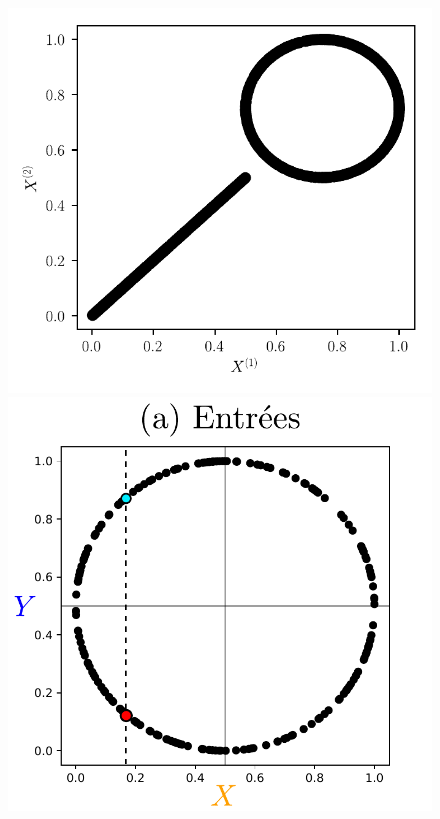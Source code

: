 \documentclass[../main]{subfiles}
\begin{document}
\begin{figure}
\begin{minipage}{\textwidth}
		\begin{minipage}{0.33\textwidth}
			\includegraphics[width=\textwidth]{2som_mix_in.pdf}
		\end{minipage}
	\end{minipage}
	\begin{minipage}{\textwidth}
		\begin{minipage}{0.33\textwidth}
			\includegraphics[width=\textwidth]{2som_inp_noU.pdf}

\end{minipage}
\end{minipage}
\end{figure}
\end{document}
